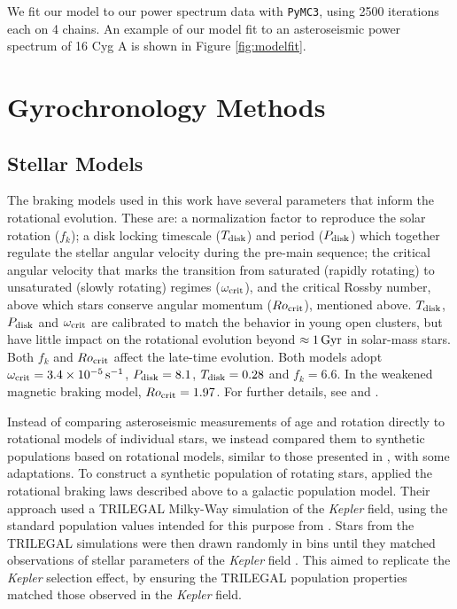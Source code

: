 \documentclass[12pt]{article}
\newcommand{\kepler}{\emph{Kepler}\xspace}
\begin{document}
We fit our model to our power spectrum data with \texttt{PyMC3}, using 2500 iterations each on 4 chains. An example of our model fit to an asteroseismic power spectrum of 16 Cyg A is shown in Figure \ref{fig:modelfit}.

\section{Gyrochronology Methods}\label{s:gyro}
\subsection{Stellar Models}\label{ssec:models}
The braking models used in this work have several parameters that inform the rotational evolution. These are: a normalization factor to reproduce the solar rotation ($f_k$); a disk locking timescale ($T_{\rm disk}$) and period ($P_{\rm disk}$) which together regulate the stellar angular velocity during the pre-main sequence; the critical angular velocity that marks the transition from saturated (rapidly rotating) to unsaturated (slowly rotating) regimes ($\omega_{\rm crit}$), and the critical Rossby number, above which stars conserve angular momentum ($Ro_{\rm crit}$), mentioned above. $T_{\rm disk}$, $P_{\rm disk}$ and $\omega_{\rm crit}$ are calibrated to match the behavior in young open clusters, but have little impact on the rotational evolution beyond $\approx 1\, \rm{Gyr}$ in solar-mass stars. Both $f_k$ and $Ro_{\rm crit}$ affect the late-time evolution. Both models adopt $\omega_{\rm crit} = 3.4  \times 10^{-5}\, \rm{s}^{-1}$, $P_{\rm disk} = 8.1$, $T_{\rm disk} = 0.28$ and $f_k = 6.6$. In the weakened magnetic braking model, $Ro_{\rm crit} = 1.97$. For further details, see \cite{vansaders+pinsonneault2013} and \cite{vansaders+2016, vansaders+2019}.

Instead of comparing asteroseismic measurements of age and rotation directly to rotational models of individual stars, we instead compared them to synthetic populations based on rotational models, similar to those presented in \cite{vansaders+2019}, with some adaptations. To construct a synthetic population of rotating stars, \cite{vansaders+2019} applied the rotational braking laws described above to a galactic population model. Their approach used a TRILEGAL \cite{girardi+2012} Milky-Way simulation of the \kepler field, using the standard population values intended for this purpose from \cite{girardi+2015}. Stars from the TRILEGAL simulations were then drawn randomly in bins until they matched observations of stellar parameters of the \kepler field \cite{mathur+2017}. This aimed to replicate the \kepler selection effect, by ensuring the TRILEGAL population properties matched those observed in the \kepler field.
\end{document}
